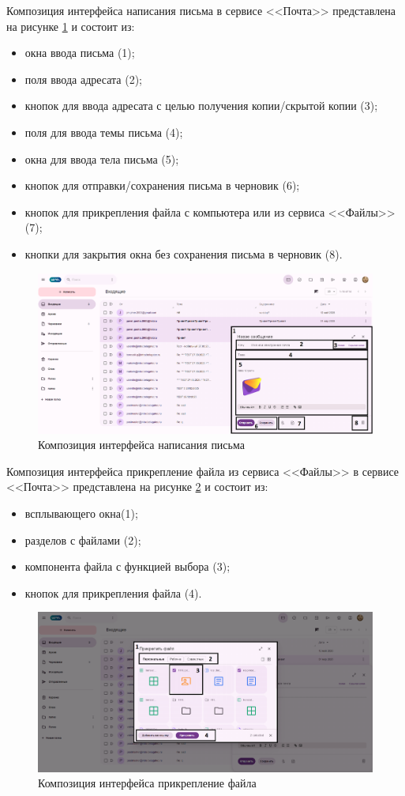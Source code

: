 Композиция интерфейса написания письма в сервисе <<Почта>> представлена на рисунке \ref{templ:image1b} и состоит из:
\begin{itemize}
  \item окна ввода письма (1);
  \item поля ввода адресата (2);
  \item кнопок для ввода адресата с целью получения копии/скрытой копии (3);
  \item поля для ввода темы письма (4);
  \item окна для ввода тела письма (5);
  \item кнопок для отправки/сохранения письма в черновик (6);
  \item кнопок для прикрепления файла с компьютера или из сервиса <<Файлы>> (7);
  \item кнопки для закрытия окна без сохранения письма в черновик (8).
\end{itemize}
\begin{figure}[H]
	\centering
	\includegraphics[width=1\linewidth]{images/почта2}
	\caption{Композиция интерфейса написания письма}
	\label{templ:image1b}
\end{figure}

Композиция интерфейса прикрепление файла из сервиса <<Файлы>> в сервисе <<Почта>> представлена на рисунке \ref{templ:image1c} и состоит из:
\begin{itemize}
  \item всплывающего окна(1);
  \item разделов с файлами (2);
  \item компонента файла с функцией выбора (3);
  \item кнопок для прикрепления файла (4).
\end{itemize}
\begin{figure}[H]
	\centering
	\includegraphics[width=1\linewidth]{images/почта3}
	\caption{Композиция интерфейса прикрепление файла}
	\label{templ:image1c}
\end{figure}


